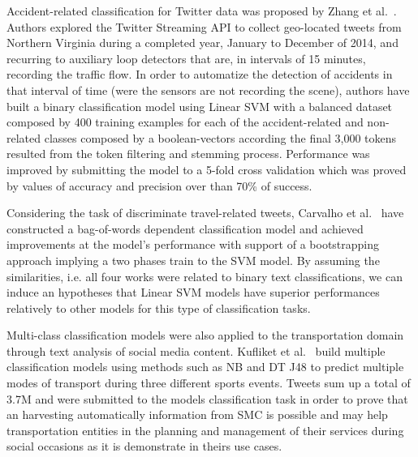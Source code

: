 Accident-related classification for Twitter data was proposed by Zhang et al.~\cite{zhang2016mining}. Authors explored the Twitter Streaming API to collect geo-located tweets from Northern Virginia during a completed year, January to December of 2014, and recurring to auxiliary loop detectors that are, in intervals of 15 minutes, recording the traffic flow. In order to automatize the detection of accidents in that interval of time (were the sensors are not recording the scene), authors have built a binary classification model using Linear \gls{SVM} with a balanced dataset composed by 400 training examples for each of the accident-related and non-related classes composed by a boolean-vectors according the final 3,000 tokens resulted from the token filtering and stemming process. Performance was improved by submitting the model to a 5-fold cross validation which was proved by values of accuracy and precision over than 70\% of success.


Considering the task of discriminate travel-related tweets, Carvalho et al.~\cite{carvalho2010real, kokkinogenis2015mobility} have constructed a bag-of-words dependent classification model and achieved improvements at the model's performance with support of a bootstrapping approach implying a two phases train to the \gls{SVM} model.  By assuming the similarities, i.e. all four works were related to binary text classifications, we can induce an hypotheses that Linear \gls{SVM} models have superior performances relatively to other models for this type of classification tasks.

Multi-class classification models were also applied to the transportation domain through text analysis of social media content. Kufliket et al.~\cite{kuflik2017automating} build multiple classification models using methods such as \gls{NB} and \gls{DT J48} to predict multiple modes of transport during three different sports events. Tweets sum up a total of 3.7M and were submitted to the models classification task in order to prove that an harvesting automatically information from \gls{SMC} is possible and may help transportation entities in the planning and management of their services during social occasions as it is demonstrate in theirs use cases.

